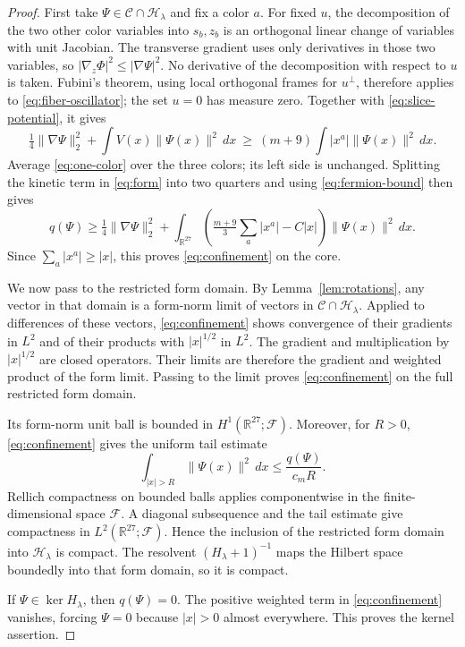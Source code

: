 \documentclass[11pt]{amsart}
\newcommand{\R}{\mathbb R}
\newcommand{\F}{\mathcal F}
\newcommand{\Core}{\mathcal C}
\newcommand{\Hphys}{\mathcal H}
\newcommand{\norm}[1]{\lVert #1\rVert}
\theoremstyle{remark}
\numberwithin{equation}{section}
\begin{document}
\begin{proof}
First take $\Psi\in\Core\cap\Hphys_\lambda$ and fix a color $a$.
For fixed $u$, the decomposition of the two other color variables
into $s_b,z_b$ is an orthogonal linear change of variables with unit
Jacobian. The transverse gradient uses only derivatives in those two
variables, so $|\nabla_z\Phi|^2\leq|\nabla\Psi|^2$. No derivative of
the decomposition with respect to $u$ is taken. Fubini's theorem,
using local orthogonal frames for $u^\perp$, therefore applies to
\eqref{eq:fiber-oscillator}; the set $u=0$ has measure zero.
Together with \eqref{eq:slice-potential}, it gives
\begin{equation}
 \tfrac14\norm{\nabla\Psi}_2^2+
   \int V(x)\norm{\Psi(x)}^2\,dx
 \ \geq\ (m+9)\int |x^a|\norm{\Psi(x)}^2\,dx.
 \label{eq:one-color}
\end{equation}
Average \eqref{eq:one-color} over the three colors; its left side
is unchanged. Splitting the kinetic term in \eqref{eq:form} into
two quarters and using \eqref{eq:fermion-bound} then gives
\[
 q(\Psi)\geq\tfrac14\norm{\nabla\Psi}_2^2+
 \int_{\R^{27}}\left(\tfrac{m+9}{3}\sum_a|x^a|-C|x|\right)
       \norm{\Psi(x)}^2\,dx.
\]
Since $\sum_a|x^a|\geq|x|$, this proves \eqref{eq:confinement}
on the core.

We now pass to the restricted form domain. By
Lemma~\ref{lem:rotations}, any vector in that domain is a form-norm
limit of vectors in
$\Core\cap\Hphys_\lambda$. Applied to differences of these vectors,
\eqref{eq:confinement} shows convergence of their gradients in $L^2$
and of their products with $|x|^{1/2}$ in $L^2$. The gradient and
multiplication by $|x|^{1/2}$ are closed operators. Their limits are
therefore the gradient and weighted product of the form limit.
Passing to the limit proves \eqref{eq:confinement} on the full
restricted form domain.

Its form-norm unit ball is bounded in $H^1(\R^{27};\F)$. Moreover,
for $R>0$, \eqref{eq:confinement} gives the uniform tail estimate
\[
 \int_{|x|>R}\norm{\Psi(x)}^2\,dx
 \leq\frac{q(\Psi)}{c_m R}.
\]
Rellich compactness on bounded balls applies componentwise in the
finite-dimensional space $\F$. A diagonal subsequence and the tail
estimate give compactness in $L^2(\R^{27};\F)$. Hence the inclusion
of the restricted form domain into $\Hphys_\lambda$ is compact.
The resolvent $(H_\lambda+1)^{-1}$ maps the Hilbert space boundedly
into that form domain, so it is compact.

If $\Psi\in\ker H_\lambda$, then $q(\Psi)=0$. The positive weighted
term in \eqref{eq:confinement} vanishes, forcing $\Psi=0$ because
$|x|>0$ almost everywhere. This proves the kernel assertion.
\end{proof}
\end{document}

